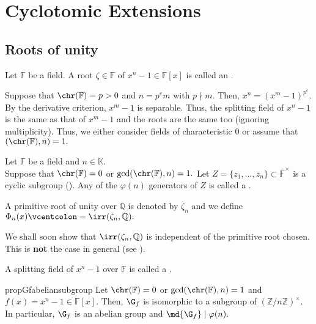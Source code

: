 \chapter{Cyclotomic Extensions}

\section{Roots of unity}

\begin{defn}%
    Let $\mathbb{F}$ be a field. A root $\zeta \in \mathbb{F}$ of $x^n - 1 \in \mathbb{F}[x]$ is called an .
\end{defn}

\begin{rem}
    Suppose that $\chr(\mathbb{F}) = p > 0$ and $n = p^em$ with $p \nmid m.$ Then, $x^n = (x^m - 1)^{p^e}.$ By the derivative criterion, $x^m - 1$ is separable. Thus, the splitting field of $x^n - 1$ is the same as that of $x^m - 1$ and the roots are the same too (ignoring multiplicity). Thus, we either consider fields of characteristic $0$ or assume that $(\chr(\mathbb{F}), n) = 1.$
\end{rem}

\begin{defn}%
    Let $\mathbb{F}$ be a field and $n \in \mathbb{K}.$ \\
    Suppose that $\chr(\mathbb{F}) = 0$ or $\gcd(\chr(\mathbb{F}), n) = 1.$ Let $Z = \{z_1, \ldots, z_n\} \subset \overline{\mathbb{F}}^\times$ is a cyclic subgroup (). Any of the $\varphi(n)$ generators of $Z$ is called a .

    A primitive root of unity over $\mathbb{Q}$ is denoted by $\zeta_n$ and we define $\Phi_n(x) \vcentcolon= \irr(\zeta_n, \mathbb{Q}).$ 
\end{defn}

\begin{rem}
    We shall soon show that $\irr(\zeta_n, \mathbb{Q})$ is independent of the primitive root chosen. This is \textbf{not} the case in general (see ).
\end{rem}

\begin{defn}%
    A splitting field of $x^n - 1$ over $\mathbb{F}$ is called a .
\end{defn}

\begin{restatable}[]{prop}{Gfabeliansubgroup}
\label{prop:Gfabeliansubgroup}
    Let $\chr(\mathbb{F}) = 0$ or $\gcd(\chr(\mathbb{F}), n) = 1$ and $f(x) = x^n - 1 \in \mathbb{F}[x].$ Then, $\G_f$ is isomorphic to a subgroup of $(\mathbb{Z}/n\mathbb{Z})^\times.$ In particular, $\G_f$ is an abelian group and $\md{\G_f} \mid \varphi(n).$ \hfill\hyperref[prop:Gfabeliansubgroup2]{\downsym}
\end{restatable}

